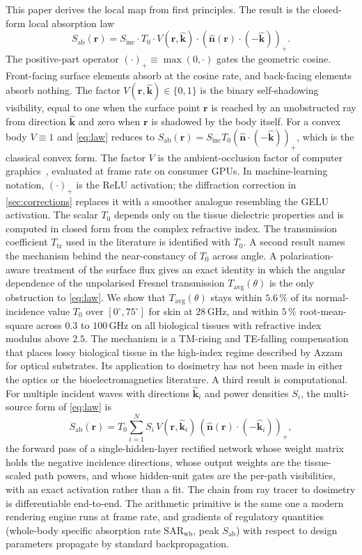 \documentclass[journal,twocolumn,10pt]{IEEEtran}
\theoremstyle{plain}
\theoremstyle{remark}
\newcommand{\khat}{\hat{\bm{k}}}
\newcommand{\nhat}{\hat{\bm{n}}}
\newcommand{\rr}{\mathbf{r}}
\newcommand{\Sinc}{S_{\mathrm{inc}}}
\newcommand{\Sab}{S_{\mathrm{ab}}}
\newcommand{\Tavg}{T_{\mathrm{avg}}}
\newcommand{\pospart}[1]{\left(#1\right)_{+}}
\newcommand{\Vis}{V}
\begin{document}
This paper derives the local map from first principles. The result
is the closed-form local absorption law
\begin{equation}\label{eq:law}
  \Sab(\rr) = \Sinc \cdot T_0 \cdot \Vis(\rr,\khat) \cdot
  \pospart{\nhat(\rr) \cdot (-\khat)}.
\end{equation}
The positive-part operator $(\cdot)_+ \equiv \max(0, \cdot)$ gates the
geometric cosine. Front-facing surface elements absorb at the cosine
rate, and back-facing elements absorb nothing. The factor
$\Vis(\rr,\khat) \in \{0,1\}$ is the binary self-shadowing visibility,
equal to one when the surface point $\rr$ is reached by an
unobstructed ray from direction $\khat$ and zero when $\rr$ is
shadowed by the body itself. For a convex body $\Vis \equiv 1$ and
\eqref{eq:law} reduces to $\Sab(\rr) = \Sinc T_0 \pospart{\nhat\cdot
(-\khat)}$, which is the classical convex form. The factor $\Vis$ is
the ambient-occlusion factor of computer
graphics~\cite{Zhukov1998,Landis2002,AkenineMoller2018}, evaluated at
frame rate on consumer GPUs. In machine-learning notation, $(\cdot)_+$
is the ReLU activation; the diffraction correction in
\cref{sec:corrections} replaces it with a smoother analogue resembling
the GELU activation. The scalar $T_0$ depends only on the
tissue dielectric properties and is computed in closed form from the
complex refractive index. The transmission coefficient
$T_{\mathrm{tr}}$ used in the literature is identified with $T_0$. A second result names the
mechanism behind the near-constancy of $T_0$ across angle. A
polarisation-aware treatment of the surface flux gives an exact
identity in which the angular dependence of the unpolarised Fresnel
transmission $\Tavg(\theta)$ is the only obstruction to
\eqref{eq:law}. We show that $\Tavg(\theta)$ stays within $5.6\,\%$
of its normal-incidence value $T_0$ over $[0^\circ, 75^\circ]$ for
skin at $28\,$GHz, and within $5\,\%$ root-mean-square across $0.3$
to $100\,$GHz on all biological tissues with refractive index modulus
above $2.5$. The mechanism is a TM-rising and TE-falling compensation
that places lossy biological tissue in the high-index regime
described by Azzam~\cite{Azzam2015} for optical substrates. Its
application to dosimetry has not been made in either the optics or
the bioelectromagnetics literature. A third result is computational. For multiple incident waves with
directions $\khat_i$ and power densities $S_i$, the multi-source form
of \eqref{eq:law} is
\begin{equation}\label{eq:relu-net}
  \Sab(\rr) = T_0 \sum_{i=1}^N S_i\,\Vis(\rr,\khat_i)\,
  \pospart{\nhat(\rr) \cdot (-\khat_i)},
\end{equation}
the forward pass of a single-hidden-layer rectified network whose
weight matrix holds the negative incidence directions, whose output
weights are the tissue-scaled path powers, and whose hidden-unit gates
are the per-path visibilities, with an exact activation rather than a
fit. The chain from ray
tracer to dosimetry is differentiable end-to-end. The arithmetic primitive is
the same one a modern rendering engine runs at frame rate, and
gradients of regulatory quantities (whole-body specific absorption
rate $\mathrm{SAR}_{\mathrm{wb}}$, peak $\Sab$) with respect to
design parameters propagate by standard backpropagation.
\end{document}

